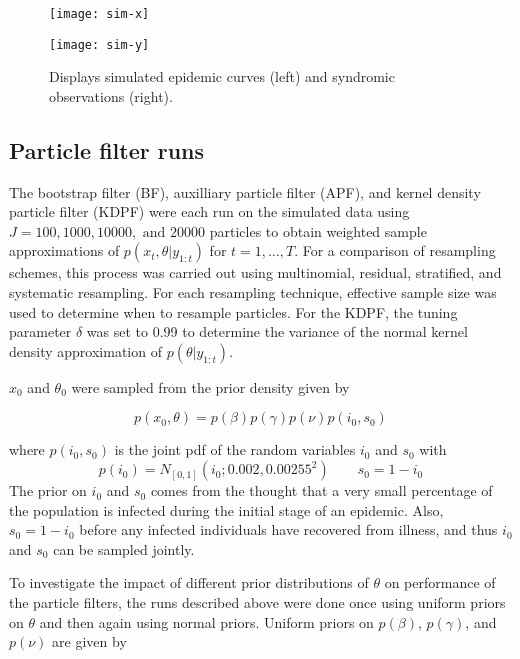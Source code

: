 \documentclass{elsarticle}
\begin{document}
\begin{figure}
\centering
\begin{minipage}{0.48\linewidth}
\texttt{[image: sim-x]}
\end{minipage}
\begin{minipage}{0.48\linewidth}
\texttt{[image: sim-y]}
\end{minipage}
\caption{Displays simulated epidemic curves (left) and syndromic observations (right).} \label{fig:data}
\end{figure}

\subsection{Particle filter runs} \label{sec:pf}

The bootstrap filter (BF), auxilliary particle filter (APF), and kernel density particle filter (KDPF) were each run on the simulated data using $J = 100, 1000, 10000, \mbox{ and } 20000$ particles to obtain weighted sample approximations of $p(x_t,\theta|y_{1:t})$ for $t = 1,\ldots,T$.  For a comparison of resampling schemes, this process was carried out using multinomial, residual, stratified, and systematic resampling.  For each resampling technique, effective sample size was used to determine when to resample particles.  For the KDPF, the tuning parameter $\delta$ was set to 0.99 to determine the variance of the normal kernel density approximation of $p(\theta|y_{1:t})$.

$x_0$ and $\theta_0$ were sampled from the prior density given by

\[p\left(x_0,\theta\right) = p\left(\beta\right)p\left(\gamma\right)p\left(\nu\right)p\left(i_0,s_0\right)\]

\noindent where $p(i_0,s_0)$ is the joint pdf of the random variables $i_0$ and $s_0$ with
\[p\left(i_0\right) = N_{[0,1]}\left(i_0;0.002,0.00255^2\right) \qquad s_0 = 1 - i_0 \]
The prior on $i_0$ and $s_0$ comes from the thought that a very small percentage of the population is infected during the initial stage of an epidemic.  Also, $s_0 = 1 - i_0$ before any infected individuals have recovered from illness, and thus $i_0$ and $s_0$ can be sampled jointly.

To investigate the impact of different prior distributions of $\theta$ on performance of the particle filters, the runs described above were done once using uniform priors on $\theta$ and then again using normal priors.  Uniform priors on $p(\beta)$, $p(\gamma)$, and $p(\nu)$ are given by
\end{document}
